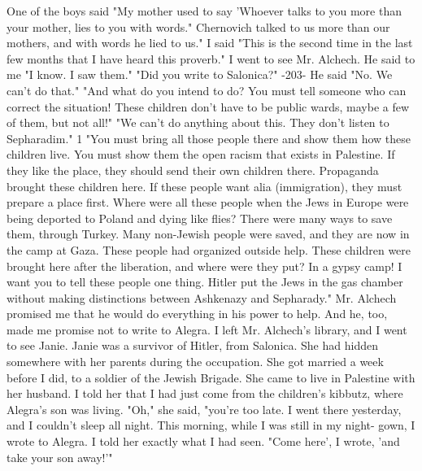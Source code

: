 One of the boys said "My mother used to say 'Whoever talks to you 
more than your mother, lies to you with words." Chernovich talked to 
us more than our mothers, and with words he lied to us." 
I said "This is the second time in the last few months that I have 
heard this proverb." 
I went to see Mr. Alchech. He said to me "I know. I saw them." 
"Did you write to Salonica?" 
-203- 
He said "No. We can't do that." 
"And what do you intend to do? You must tell someone who can 
correct the situation! These children don't have to be public wards, 
maybe a few of them, but not all!" 
"We can't do anything about this. They don't listen to Sepharadim." 
1 
"You must bring all those people there and show them how these 
children live. You must show them the open racism that exists in Palestine. If they like the place, they should send their own children 
there. Propaganda brought these children here. If these people want 
alia (immigration), they must prepare a place first. Where were all 
these people when the Jews in Europe were being deported to Poland and 
dying like flies? There were many ways to save them, through Turkey. 
Many non-Jewish people were saved, and they are now in the camp at Gaza. 
These people had organized outside help. These children were brought 
here after the liberation, and where were they put? In a gypsy camp! 
I want you to tell these people one thing. Hitler put the Jews in the 
gas chamber without making distinctions between Ashkenazy and Sepharady." 
Mr. Alchech promised me that he would do everything in his power 
to help. And he, too, made me promise not to write to Alegra. I left 
Mr. Alchech's library, and I went to see Janie. 
Janie was a survivor of Hitler, from Salonica. She had hidden 
somewhere with her parents during the occupation. She got married a 
week before I did, to a soldier of the Jewish Brigade. She came to 
live in Palestine with her husband. I told her that I had just come 
from the children's kibbutz, where Alegra's son was living. 
"Oh," she said, "you're too late. I went there yesterday, and I 
couldn't sleep all night. This morning, while I was still in my night-
gown, I wrote to Alegra. I told her exactly what I had seen. "Come 
here', I wrote, 'and take your son away!'" 


